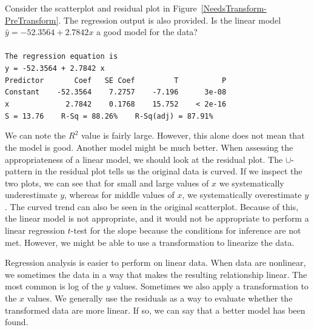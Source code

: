 \begin{examplewrap}
\begin{nexample}{Consider the scatterplot and residual plot in Figure~\ref{NeedsTransform-PreTransform}. The regression output is also provided.  Is the linear model $\hat{y} = -52.3564 + 2.7842 x$ a good model for the data?
\\
\\
\texttt{The regression equation is} \\

\texttt{y = -52.3564 + 2.7842 x} \\

\texttt{Predictor \ \ \ \ \ \ Coef \ \ SE Coef \ \ \ \ \ \ \ \ T \ \ \ \ \ \ \ \ \ P} \\
\texttt{Constant \ \ \ -52.3564 \ \ \ 7.2757 \ \ \ -7.196 \ \ \ \ \ 3e-08} \\
\texttt{x \ \ \ \ \ \ \ \ \ \ \ \ 2.7842 \ \ \ 0.1768 \ \ \ 15.752 \ \ \ < 2e-16} \\

\texttt{S = 13.76\ \ \ \ R-Sq = 88.26\% \ \ \ R-Sq(adj) = 87.91\%}
}

We can note the $R^2$ value is fairly large.  However, this alone does not mean that the model is good.  Another model might be much better.  When assessing the appropriateness of a linear model, we should look at the residual plot.  The $\cup$-pattern in the residual plot tells us the original data is curved. If we inspect the two plots, we can see that for small and large values of $x$ we systematically underestimate $y$, whereas for middle values of $x$, we systematically overestimate $y$.  The curved trend can also be seen in the original scatterplot.  Because of this, the linear model is not appropriate, and it would not be appropriate to perform a linear regression $t$-test for the slope because the conditions for inference are not met.  However, we might be able to use a transformation to linearize the data.
\end{nexample}
\end{examplewrap}

Regression analysis is easier to perform on linear data.  When data are nonlinear, we sometimes  the data in a way that makes the resulting relationship linear.  The most common  is log of the $y$ values. Sometimes we also apply a transformation to the $x$ values.  We generally use the residuals as a way to evaluate whether the transformed data are more linear. If so, we can say that a better model has been found.


